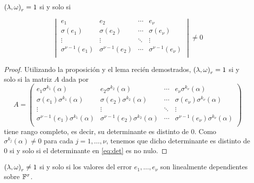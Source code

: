 \begin{proposition}
\label{prop:key_eq_error_iif_det}
\({(\lambda, \omega)}_r = 1\) si y solo si

\begin{equation}
\label{eq:det}
\begin{vmatrix}
e_1 & e_2 & \cdots & e_{\nu} \\
\sigma(e_1) & \sigma(e_2) & \cdots & \sigma(e_{\nu}) \\
\vdots &\vdots &\ddots &\vdots \\
\sigma^{\nu-1}(e_1) & \sigma^{\nu-1}(e_2) & \cdots & \sigma^{\nu-1}(e_{\nu}) \\
\end{vmatrix}
\neq 0
\end{equation}

\end{proposition}
\begin{proof}
Utilizando la proposición y el lema recién demostrados, \({(\lambda, \omega)}_r = 1\) si y solo si la matriz \(A\) dada por
 \[
A = \begin{pmatrix}
e_1\sigma^{k_1}(\alpha) & e_2\sigma^{k_2}(\alpha) & \cdots & e_{\nu}\sigma^{k_\nu}(\alpha) \\
\sigma(e_1)\sigma^{k_1}(\alpha) & \sigma(e_2)\sigma^{k_2}(\alpha) & \cdots & \sigma(e_{\nu})\sigma^{k_\nu}(\alpha) \\
\vdots &\vdots &\ddots &\vdots \\
\sigma^{\nu-1}(e_1)\sigma^{k_1}(\alpha) & \sigma^{\nu-1}(e_2)\sigma^{k_2}(\alpha) & \cdots & \sigma^{\nu-1}(e_{\nu}) \sigma^{k_\nu}(\alpha)\\
\end{pmatrix}
\]
tiene rango completo, es decir, su determinante es distinto de 0. Como \(\sigma^{k_j}(\alpha) \neq 0\) para cada \(j = 1, \ldots, \nu\), tenemos que dicho determinante es distinto de 0 si y solo si el determinante en \ref{eq:det} es no nulo.
\end{proof}

\begin{theorem}
\({(\lambda, \omega)}_r \neq 1\) si y solo si los valores del error \(e_1, \ldots, e_\nu\) son linealmente dependientes sobre \(\mathbb{F}^{\sigma}\).
\end{theorem}

